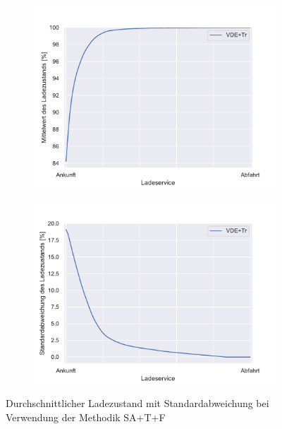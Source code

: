 \begin{figure}
	\begin{subfigure}{0.49\linewidth}
		\includegraphics[width=\linewidth]{img/VDE_tau_trafo/tau_VDE_trafo_2_soc_mean.pdf}
        \label{ABB_VDETrafo_SocMEAN}
	\end{subfigure}
	\begin{subfigure}{0.49\linewidth}
		\includegraphics[width=\linewidth]{img/VDE_tau_trafo/tau_VDE_trafo_2_soc_std.pdf}
        \label{ABB_VDETrafo_SocSTD}
	\end{subfigure}
	\caption{Durchschnittlicher Ladezustand mit Standardabweichung bei Verwendung der Methodik SA+T+F}
\end{figure}
